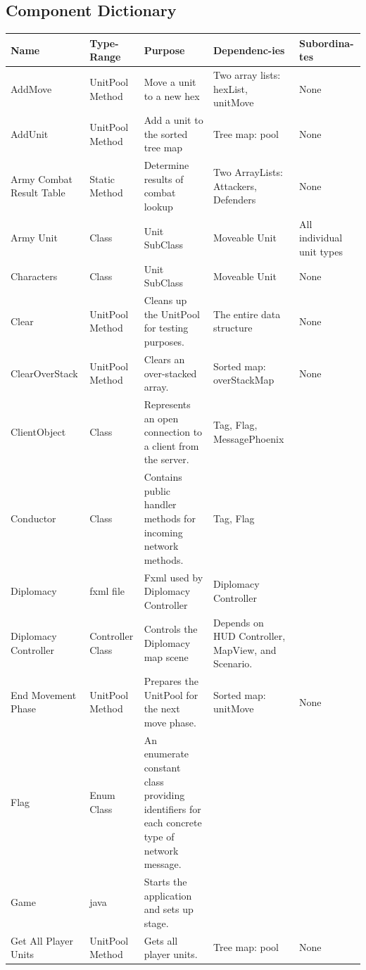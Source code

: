 \documentclass[12pt,a4paper,titlepage]{article}
\begin{document}
\subsection{Component Dictionary}
\small{
\begin{center}
\keepXColumns
\noindent\begin{tabularx}{\linewidth}{|X|X|p{2in}|X|X|}\hline
\textbf{Name} & \textbf{Type-Range} & \textbf{Purpose} & \textbf{Dependenc-ies} & \textbf{Subordina-tes}\\
\hline
AddMove & UnitPool Method & Move a unit to a new hex & Two array lists: hexList, unitMove & None\\
\hline
AddUnit & UnitPool Method & Add a unit to the sorted tree map & Tree map: pool & None\\
\hline
Army Combat Result Table & Static Method & Determine results of combat lookup & Two ArrayLists: Attackers, Defenders & None\\
\hline
Army Unit & Class & Unit SubClass & Moveable Unit & All individual unit types\\
\hline
Characters & Class & Unit SubClass & Moveable Unit & None\\
\hline
Clear & UnitPool Method & Cleans up the UnitPool for testing purposes. & The entire data structure & None\\
\hline
ClearOverStack & UnitPool Method & Clears an over-stacked array. & Sorted map: overStackMap & None\\
\hline
ClientObject & Class & Represents an open connection to a client from the server. & Tag, Flag, MessagePhoenix & \\
\hline
Conductor & Class & Contains public handler methods for incoming network methods. & Tag, Flag & \\
\hline
Diplomacy & fxml file & Fxml used by Diplomacy Controller & Diplomacy Controller &\\
\hline
Diplomacy Controller & Controller Class & Controls the Diplomacy map scene & Depends on HUD Controller, MapView, and Scenario. & \\
\hline
End Movement Phase & UnitPool Method & Prepares the UnitPool for the next move phase. & Sorted map: unitMove & None\\
\hline
Flag & Enum Class & An enumerate constant class providing identifiers for each concrete type of network message. & & \\
\hline
Game & java & Starts the application and sets up stage. & & \\
\hline
Get All Player Units & UnitPool Method & Gets all player units. & Tree map: pool & None\\

\end{tabularx}
\end{center}}
\end{document}
